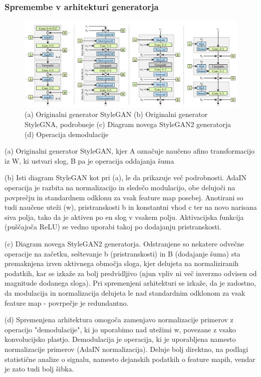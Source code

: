 \documentclass[a4paper,12pt,openright]{book}
\begin{document}
\subsubsection{Spremembe v arhitekturi generatorja}

\begin{figure}[htb]
\begin{center}
  \includegraphics[width=1\textwidth]{images/stylegan2_generator.png}
\end{center}
  \caption{(a) Originalni generator StyleGAN (b) Originalni generator StyleGNA, podrobneje (c) Diagram novega StyleGAN2 generatorja (d) Operacija demodulacije}
  \label{Spremembe v arhitekturi StyleGAN2 generatorja}
\end{figure}

(a) Originalni generator StyleGAN, kjer A označuje naučeno
afino transformacijo iz W, ki ustvari slog, B pa je operacija oddajanja šuma 

(b) Isti diagram StyleGAN kot pri (a), le da prikazuje več podrobnosti. AdaIN operacija je razbita na normalizacijo in sledečo modulacijo, obe delujoči na povprečju in standardnem odklonu za vsak feature map posebej. Anotirani so tudi naučene uteži (w), pristranskosti b in konstantni vhod c ter na novo narisana siva polja, tako da je aktiven po en slog v vsakem polju. Aktivacijska funkcija (puščajoča ReLU) se vedno uporabi takoj po dodajanju pristranskosti. 

(c) Diagram novega StyleGAN2 generatorja. Odstranjene so nekatere odvečne operacije na začetku, seštevanje b (pristranskosti) in B (dodajanje šuma) sta premaknjena izven aktivnega območja sloga, kjer delujeta na normaliziranih podatkih, kar se izkaže za bolj predvidljivo (njun vpliv ni več inverzno odvisen od magnitude dodanega sloga). Pri spremenjeni arhitekturi se izkaže, da je zadostno, da modulacija in normalizacija delujeta le nad standardnim odklonom za vsak feature map - povrpečje je redundantno.

(d) Spremenjena arhitektura omogoča zamenjavo normalizacije primerov z operacijo "demodulacije", ki jo uporabimo nad utežimi w, povezane z vsako konvolucijsko plastjo. Demodulacija je operacija, ki je uporabljena namesto normalizacije primerov (AdaIN normalizacija). Deluje bolj direktno, na podlagi statistične analize o signalu, namesto dejanskih podatkih o feature mapih, vendar je zato tudi bolj šibka.
\end{document}
